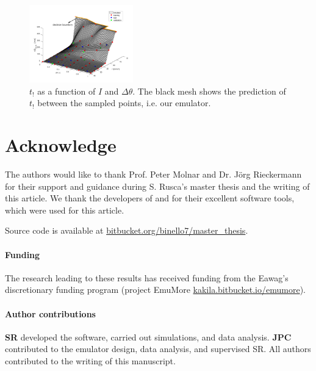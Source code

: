 \documentclass[12pt,a4paper,english,twocolumn,fleqn]{narms}
\begin{document}
\begin{figure}[htpb]
  \centering
  \includegraphics[width=0.4\textwidth]{img/emulator.png}
  \caption{$t_!$ as a function of $I$ and $\Delta\theta$. The black mesh shows the prediction of $t_!$ between the sampled points, i.e. our emulator.}
  \label{img:emulator}
\end{figure}



\section{Acknowledge}
The authors would like to thank Prof. Peter Molnar and Dr. Jörg Rieckermann for their support and guidance during S. Rusca's master thesis and the writing of this article.
We thank the developers of  and  for their excellent software tools, which were used for this article.

Source code is available at \url{bitbucket.org/binello7/master_thesis}.

\paragraph*{Funding} The research leading to these results has received funding from the Eawag's discretionary funding program (project EmuMore \url{kakila.bitbucket.io/emumore}).

\paragraph*{Author contributions} \textbf{SR} developed the software, carried out simulations, and data analysis. \textbf{JPC} contributed to the emulator design, data analysis, and supervised SR. All authors contributed to the writing of this manuscript.

\sloppy


\end{document}
